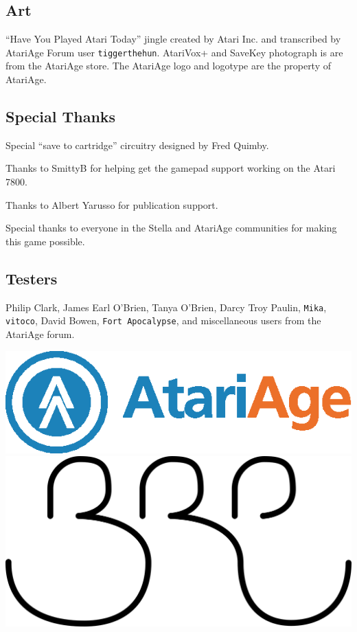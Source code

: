 \documentclass[9pt,twocolumn,openany,article]{memoir}
\newcommand\englishskip{\vspace{14pt}}
\begin{document}
\subsection{Art}

{ \small  ``Have You Played Atari  Today'' jingle created by  Atari Inc.
  and  transcribed  by  AtariAge Forum  user  \texttt{tigger\-the\-hun}.
  AtariVox+     \ifdefined\ATARIAGESAVE\else    and     SaveKey    \fi{}
  photograph\ifdefined\ATARIAGESAVE{}  is    are  \fi  from  the
  AtariAge store. \ifdefined\ATARIAGESAVE The AtariAge logo and logotype
  are the property of AtariAge. \fi }

\subsection{Special Thanks}

{ \small

  Special ``save to cartridge'' circuitry designed by Fred Quimby.

  Thanks to SmittyB  for helping get the gamepad support  working on the
  Atari 7800.

  Thanks to Albert Yarusso for publication support.

  Special thanks to everyone in  the Stella and AtariAge communities for
  making this game possible. }

\subsection{Testers}

{ \small  Philip Clark,  James Earl O'Brien,  Tanya O'Brien,  Darcy Troy
  Paulin,  \texttt{Mika},  \texttt{vitoco},  David  Bowen,  \texttt{Fort
    Apocalypse}, and miscellaneous users from the AtariAge forum. }

\vfill

\begin{center}
  \ifdefined\ATARIAGESAVE
  \includegraphics[width=.6667\columnwidth]{../Manual/AtariAgeHorizontalColor.eps}
  \englishskip
  \fi
  \includegraphics[width=.333\columnwidth]{../Manual/BRP.png}
\end{center}
\end{document}

